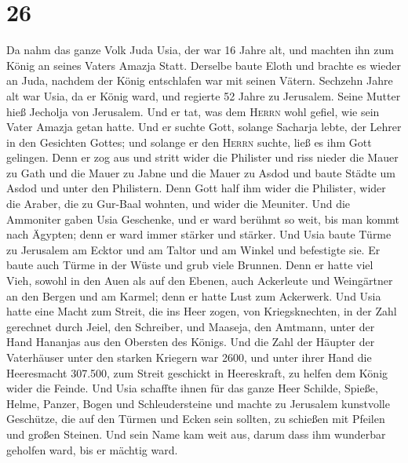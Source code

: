 \hypertarget{section-25}{%
\section{26}\label{section-25}}

 Da nahm das ganze Volk Juda Usia, der war 16 Jahre alt,
und machten ihn zum König an seines Vaters Amazja Statt. 
Derselbe baute Eloth und brachte es wieder an Juda, nachdem der König
entschlafen war mit seinen Vätern.  Sechzehn Jahre alt war
Usia, da er König ward, und regierte 52 Jahre zu Jerusalem. Seine Mutter
hieß Jecholja von Jerusalem.  Und er tat, was dem
\textsc{Herrn} wohl gefiel, wie sein Vater Amazja getan hatte.
 Und er suchte Gott, solange Sacharja lebte, der Lehrer in
den Gesichten Gottes; und solange er den \textsc{Herrn} suchte, ließ es
ihm Gott gelingen.  Denn er zog aus und stritt wider die
Philister und riss nieder die Mauer zu Gath und die Mauer zu Jabne und
die Mauer zu Asdod und baute Städte um Asdod und unter den Philistern.
 Denn Gott half ihm wider die Philister, wider die Araber,
die zu Gur-Baal wohnten, und wider die Meuniter.  Und die
Ammoniter gaben Usia Geschenke, und er ward berühmt so weit, bis man
kommt nach Ägypten; denn er ward immer stärker und stärker.
 Und Usia baute Türme zu Jerusalem am Ecktor und am Taltor
und am Winkel und befestigte sie.  Er baute auch Türme in
der Wüste und grub viele Brunnen. Denn er hatte viel Vieh, sowohl in den
Auen als auf den Ebenen, auch Ackerleute und Weingärtner an den Bergen
und am Karmel; denn er hatte Lust zum Ackerwerk.  Und
Usia hatte eine Macht zum Streit, die ins Heer zogen, von
Kriegsknechten, in der Zahl gerechnet durch Jeiel, den Schreiber, und
Maaseja, den Amtmann, unter der Hand Hananjas aus den Obersten des
Königs.  Und die Zahl der Häupter der Vaterhäuser unter
den starken Kriegern war 2600,  und unter ihrer Hand die
Heeresmacht 307.500, zum Streit geschickt in Heereskraft, zu helfen dem
König wider die Feinde.  Und Usia schaffte ihnen für das
ganze Heer Schilde, Spieße, Helme, Panzer, Bogen und Schleudersteine
 und machte zu Jerusalem kunstvolle Geschütze, die auf
den Türmen und Ecken sein sollten, zu schießen mit Pfeilen und großen
Steinen. Und sein Name kam weit aus, darum dass ihm wunderbar geholfen
ward, bis er mächtig ward.

